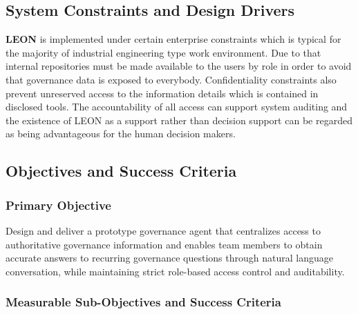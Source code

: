 \FloatBarrier

\subsection{\textcolor[HTML]{003D99}{System Constraints and Design Drivers}}
\label{subsec:constraints}

\textbf{\textcolor[HTML]{0066CC}{LEON}} is implemented under certain enterprise constraints which is typical for the majority of industrial engineering type work environment. Due to that internal repositories must be made available to the users by role in order to avoid that governance data is exposed to everybody. Confidentiality constraints also prevent unreserved access to the information details which is contained in disclosed tools. The accountability of all access can support system auditing and the existence of LEON as a support rather than decision support can be regarded as being advantageous for the human decision makers.

\FloatBarrier

\subsection{\textcolor[HTML]{003D99}{Objectives and Success Criteria}}
\label{subsec:objectives}

\subsubsection*{\textbf{\textcolor[HTML]{0066CC}{Primary Objective}}}

Design and deliver a prototype governance agent that centralizes access to authoritative governance information and enables team members to obtain accurate answers to recurring governance questions through natural language conversation, while maintaining strict role-based access control and auditability.

\vspace{0.5cm}

\subsubsection*{\textbf{\textcolor[HTML]{0066CC}{Measurable Sub-Objectives and Success Criteria}}}

